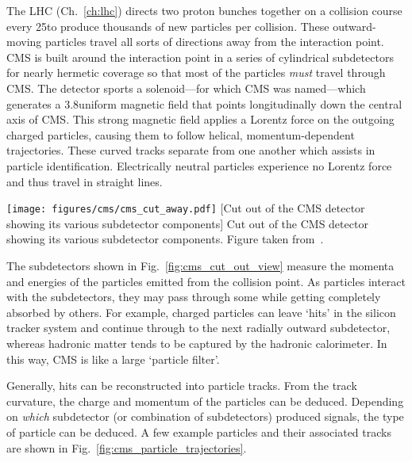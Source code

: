 The LHC (Ch.~\ref{ch:lhc}) directs two proton bunches together on a collision course every 25\ns to produce thousands of new particles per \pp collision.
These outward-moving particles travel all sorts of directions away from the interaction point.
CMS is built around the interaction point in a series of cylindrical subdetectors for nearly hermetic coverage so that most of the particles \emph{must} travel through CMS.
The detector sports a solenoid---for which CMS was named---which generates a 3.8\tesla uniform magnetic field that points longitudinally down the central axis of CMS.
This strong magnetic field applies a Lorentz force on the outgoing charged particles, causing them to follow helical, momentum-dependent trajectories.
These curved tracks separate from one another which assists in particle identification.
Electrically neutral particles experience no Lorentz force and thus travel in straight lines.
\begin{multiFigure}
    \centering
    \texttt{[image: figures/cms/cms\_cut\_away.pdf]}
        [Cut out of the CMS detector showing its various subdetector components]
        {Cut out of the CMS detector showing its various subdetector components.
        Figure taken from~\cite{cms_cut_away}.}
    \label{fig:cms_cut_out_view}
\end{multiFigure}

The subdetectors shown in Fig.~\ref{fig:cms_cut_out_view} measure the momenta and energies of the particles emitted from the \pp collision point.
As particles interact with the subdetectors, they may pass through some while getting completely absorbed by others.
For example, charged particles can leave `hits' in the silicon tracker system and continue through to the next radially outward subdetector, whereas hadronic matter tends to be captured by the hadronic calorimeter.
In this way, CMS is like a large `particle filter'.

Generally, hits can be reconstructed into particle tracks.
From the track curvature, the charge and momentum of the particles can be deduced.
Depending on \emph{which} subdetector (or combination of subdetectors) produced signals, the type of particle can be deduced.
A few example particles and their associated tracks are shown in Fig.~\ref{fig:cms_particle_trajectories}.

